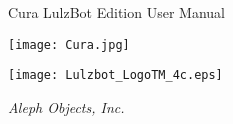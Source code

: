 %
%
%
%
%

\date {}
\thispagestyle{empty}
\begingroup
\centering 

\begin{center}
\fontsize{24pt}{1em}\selectfont Cura LulzBot Edition User Manual

\end{center}

\par


\texttt{[image: Cura.jpg]}

\begin{center}
\texttt{[image: Lulzbot\_LogoTM\_4c.eps]}

{\large \itshape Aleph Objects, Inc.}
\end{center}
\endgroup
